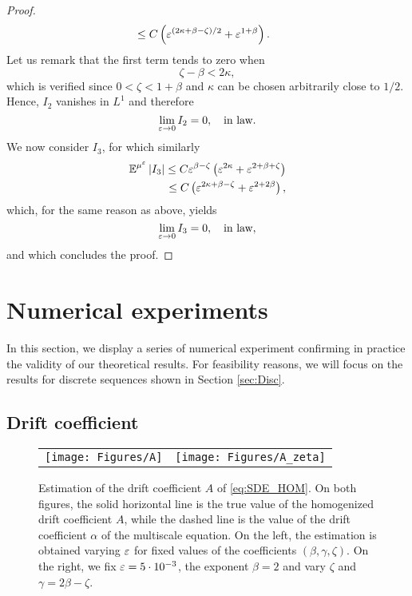 \documentclass[10pt]{article}
\begin{document}
\begin{proof}
\begin{equation}
\begin{aligned}
		&\leq C \left(\varepsilon^{(2\kappa+\beta-\zeta)/2} + \varepsilon^{1+\beta}\right).
	\end{aligned}
	\end{equation}	
	Let us remark that the first term tends to zero when
	\begin{equation}
		\zeta - \beta < 2\kappa,
	\end{equation}
	which is verified since $0 < \zeta < 1 + \beta$ and $\kappa$ can be chosen arbitrarily close to $1/2$. Hence, $I_2$ vanishes in $L^1$ and therefore
	\begin{equation}
		\lim_{\varepsilon\to 0} I_2 = 0, \quad \text{in law}.
	\end{equation}
	We now consider $I_3$, for which similarly
	\begin{equation}
	\begin{aligned}
		\operatorname{\mathbb{E}}^{\mu^\varepsilon}\left\lvert I_3\right\rvert \leq C \varepsilon^{\beta - \zeta} \left(\varepsilon^{2\kappa} + \varepsilon^{2+\beta + \zeta}\right)\\
		\leq C\left(\varepsilon^{2\kappa + \beta - \zeta} + \varepsilon^{2+2\beta}\right),
	\end{aligned}	
	\end{equation}
	which, for the same reason as above, yields
	\begin{equation}
		\lim_{\varepsilon\to 0} I_3 = 0, \quad \text{in law},
	\end{equation}
	and which concludes the proof.
\end{proof}


\section{Numerical experiments}

In this section, we display a series of numerical experiment confirming in practice the validity of our theoretical results. For feasibility reasons, we will focus on the results for discrete sequences shown in Section \ref{sec:Disc}.

\subsection{Drift coefficient}

\begin{figure}[t]
	\centering
	\begin{tabular}{cc}
		\texttt{[image: Figures/A]} & \texttt{[image: Figures/A\_zeta]}
	\end{tabular}
	\caption{Estimation of the drift coefficient $A$ of \eqref{eq:SDE_HOM}. On both figures, the solid horizontal line is the true value of the homogenized drift coefficient $A$, while the dashed line is the value of the drift coefficient $\alpha$ of the multiscale equation. On the left, the estimation is obtained varying $\varepsilon$ for fixed values of the coefficients $(\beta, \gamma, \zeta)$. On the right, we fix $\varepsilon = 5\cdot 10^{-3}$, the exponent $\beta = 2$ and vary $\zeta$ and $\gamma = 2\beta - \zeta$.}
	\label{fig:A}
\end{figure} 
\end{document}
